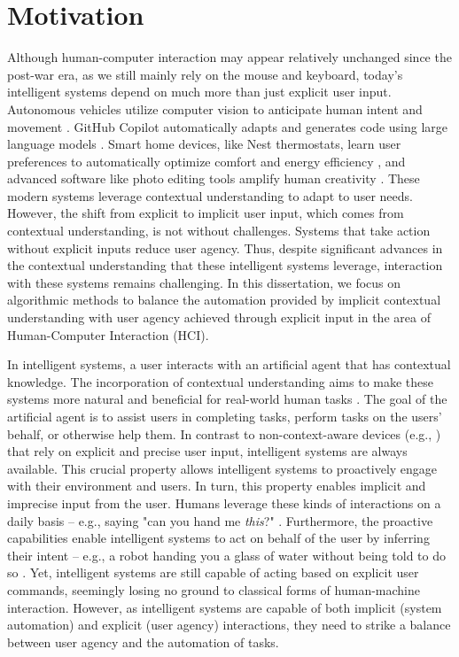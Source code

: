 \section{Motivation}
Although human-computer interaction may appear relatively unchanged since the post-war era, as we still mainly rely on the mouse and keyboard, today's intelligent systems depend on much more than just explicit user input. Autonomous vehicles utilize computer vision to anticipate human intent and movement \cite{janai2020computer, maqueda2018event, hee2013motion}. GitHub Copilot automatically adapts and generates code using large language models \cite{wermelinger2023using, imai2022github}. Smart home devices, like Nest thermostats, learn user preferences to automatically optimize comfort and energy efficiency \cite{yang2013learning, pisharoty2015thermocoach}, and advanced software like photo editing tools amplify human creativity \cite{liu20233dall}. These modern systems leverage contextual understanding to adapt to user needs. However, the shift from explicit to implicit user input, which comes from contextual understanding, is not without challenges. Systems that take action without explicit inputs reduce user agency. Thus, despite significant advances in the contextual understanding that these intelligent systems leverage, interaction with these systems remains challenging. In this dissertation, we focus on algorithmic methods to balance the automation provided by implicit contextual understanding with user agency achieved through explicit input in the area of Human-Computer Interaction (HCI).

In intelligent systems, a user interacts with an artificial agent that has contextual knowledge. The incorporation of contextual understanding aims to make these systems more natural and beneficial for real-world human tasks \cite{xu2023transitioning}. The goal of the artificial agent is to assist users in completing tasks, perform tasks on the users' behalf, or otherwise help them. In contrast to non-context-aware devices (e.g., \cite{engelbart1962augmenting, engelbart1968research}) that rely on explicit and precise user input, intelligent systems are always available. This crucial property allows intelligent systems to proactively engage with their environment and users. In turn, this property enables implicit and imprecise input from the user. Humans leverage these kinds of interactions on a daily basis -- e.g., saying "can you hand me \emph{this}?" \cite{lee2024gazepointar}. Furthermore, the proactive capabilities enable intelligent systems to act on behalf of the user by inferring their intent -- e.g., a robot handing you a glass of water without being told to do so \cite{christen2023learning}. Yet, intelligent systems are still capable of acting based on explicit user commands, seemingly losing no ground to classical forms of human-machine interaction. However, as intelligent systems are capable of both implicit (system automation) and explicit (user agency) interactions, they need to strike a balance between user agency and the automation of tasks.


